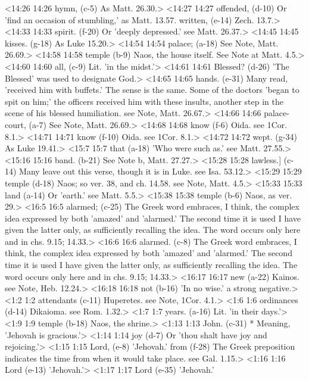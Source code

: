 <14:26 14:26  hymn, (c-5)  As Matt. 26.30.>
<14:27 14:27  offended, (d-10)  Or 'find an occasion of stumbling,' as Matt. 13.57.
  written, (e-14)  Zech. 13.7.>
<14:33 14:33  spirit. (f-20)  Or 'deeply depressed.' see Matt. 26.37.>
<14:45 14:45  kisses. (g-18)  As Luke 15.20.>
<14:54 14:54  palace; (a-18) See Note, Matt. 26.69.>
<14:58 14:58  temple (b-9)  Naos, the house itself.  See Note at Matt. 4.5.>
<14:60 14:60  all, (c-9)  Lit. 'in the midst.'>
<14:61 14:61  Blessed? (d-26)  'The Blessed' was used to designate God.>
<14:65 14:65  hands. (e-31)  Many read, 'received him with buffets.' The sense is the  same. Some of the doctors 'began to spit on him;' the officers  received him with these insults, another step in the scene of  his blessed humiliation. see Note, Matt. 26.67.>
<14:66 14:66  palace-court, (a-7)  See Note, Matt. 26.69.>
<14:68 14:68  know (f-6) Oida. see 1Cor. 8.1.>
<14:71 14:71  know (f-10)  Oida. see 1Cor. 8.1.>
<14:72 14:72  wept. (g-34)  As Luke 19.41.>
<15:7 15:7  that (a-18)  'Who were such as.' see Matt. 27.55.>
<15:16 15:16  band. (b-21)  See Note b, Matt. 27.27.>
<15:28 15:28  lawless.] (c-14)  Many leave out this verse, though it is in Luke. see Isa.  53.12.>
<15:29 15:29  temple (d-18)  Naos; so ver. 38, and ch. 14.58. see Note, Matt. 4.5.>
<15:33 15:33  land (a-14)  Or 'earth.' see Matt. 5.5.>
<15:38 15:38  temple (b-6)  Naos, as ver. 29.>
<16:5 16:5  alarmed; (c-25) The Greek word embraces, I think, the complex idea expressed by both 'amazed' and 'alarmed.' The second time it is used I have given the latter only, as sufficiently recalling the idea. The word occurs only here and in chs. 9.15; 14.33.>
<16:6 16:6  alarmed. (c-8)  The Greek word embraces, I think, the complex idea expressed  by both 'amazed' and 'alarmed.' The second time it is used I  have given the latter only, as sufficiently recalling the idea.  The word occurs only here and in chs. 9.15; 14.33.>
<16:17 16:17  new (a-22)  Kainos. see Note, Heb. 12.24.>
<16:18 16:18  not (b-16)  'In no wise.' a strong negative.>
<1:2 1:2  attendants (c-11)  Huperetes. see Note, 1Cor. 4.1.>
<1:6 1:6  ordinances (d-14)  Dikaioma. see Rom. 1.32.>
<1:7 1:7  years. (a-16)  Lit. 'in their days.'>
<1:9 1:9  temple (b-18)  Naos, the shrine.>
<1:13 1:13  John. (c-31)  * Meaning, 'Jehovah is gracious.'>
<1:14 1:14  joy (d-7)  Or 'thou shalt have joy and rejoicing.'>
<1:15 1:15  Lord, (e-8) 'Jehovah.'
  from (f-28)  The Greek preposition indicates the time from when it would  take place. see Gal. 1.15.>
<1:16 1:16  Lord (e-13) 'Jehovah.'>
<1:17 1:17  Lord (e-35) 'Jehovah.'
